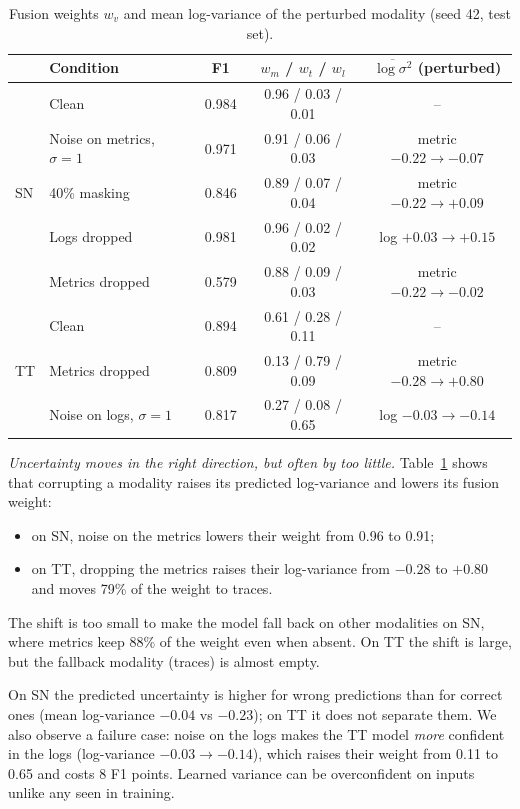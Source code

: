 \documentclass[journal]{IEEEtran}
\begin{document}
\begin{table}[!t]
\caption{Fusion weights $w_v$ and mean log-variance of the perturbed modality (seed 42, test set).}
\label{tab:fusion}
\centering
\footnotesize
\setlength{\tabcolsep}{3pt}
\begin{tabular}{@{}llccc@{}}
\toprule
& Condition & F1 & $w_m$ / $w_t$ / $w_l$ & $\overline{\log\sigma^2}$ (perturbed) \\
\midrule
\multirow{5}{*}{SN}
& Clean & 0.984 & 0.96 / 0.03 / 0.01 & -- \\
& Noise on metrics, $\sigma=1$ & 0.971 & 0.91 / 0.06 / 0.03 & metric $-0.22\rightarrow-0.07$ \\
& 40\% masking & 0.846 & 0.89 / 0.07 / 0.04 & metric $-0.22\rightarrow+0.09$ \\
& Logs dropped & 0.981 & 0.96 / 0.02 / 0.02 & log $+0.03\rightarrow+0.15$ \\
& Metrics dropped & 0.579 & 0.88 / 0.09 / 0.03 & metric $-0.22\rightarrow-0.02$ \\
\midrule
\multirow{3}{*}{TT}
& Clean & 0.894 & 0.61 / 0.28 / 0.11 & -- \\
& Metrics dropped & 0.809 & 0.13 / 0.79 / 0.09 & metric $-0.28\rightarrow+0.80$ \\
& Noise on logs, $\sigma=1$ & 0.817 & 0.27 / 0.08 / 0.65 & log $-0.03\rightarrow-0.14$ \\
\bottomrule
\end{tabular}
\end{table}

\emph{Uncertainty moves in the right direction, but often by too little.} Table~\ref{tab:fusion} shows that
corrupting a modality raises its predicted log-variance and lowers its fusion weight:
\begin{itemize}
  \item on SN, noise on the metrics lowers their weight from 0.96 to 0.91;
  \item on TT, dropping the metrics raises their log-variance from $-0.28$ to $+0.80$ and moves 79\% of the
  weight to traces.
\end{itemize}
The shift is too small to make the model fall back on other modalities on SN, where metrics keep 88\% of the
weight even when absent. On TT the shift is large, but the fallback modality (traces) is almost empty.

On SN the predicted uncertainty is higher for wrong predictions than for correct ones (mean log-variance
$-0.04$ vs $-0.23$); on TT it does not separate them. We also observe a failure case: noise on the logs makes
the TT model \emph{more} confident in the logs (log-variance $-0.03\rightarrow-0.14$), which raises their weight
from 0.11 to 0.65 and costs 8 F1 points. Learned variance can be overconfident on inputs unlike any seen in
training.
\end{document}

